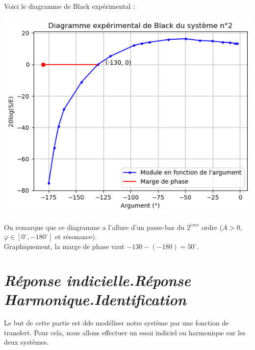\documentclass[12pt]{article}
\begin{document}
    Voici le diagramme de Black expérimental : 
    \begin{center}
        \includegraphics{TP1/Syst_2/Diagramme de Black experimental_syst2.png}
    \end{center}
    On remarque que ce diagramme a l'allure d'un passe-bas du $2^{\grave{e}me}$ ordre ($A > 0$, $\varphi \in [0^\circ,-180^\circ]$ et résonance).
    \\Graphiquement, la marge de phase vaut $-130 - (-180) = 50^\circ$.
\newpage
    \section{\itshape Réponse indicielle.Réponse Harmonique.Identification}

    Le but de cette partie est dde modéliser notre système par une fonction de transfert. Pour cela, nous allons effectuer un essai indiciel ou harmonique sur les deux systèmes.
\end{document}
